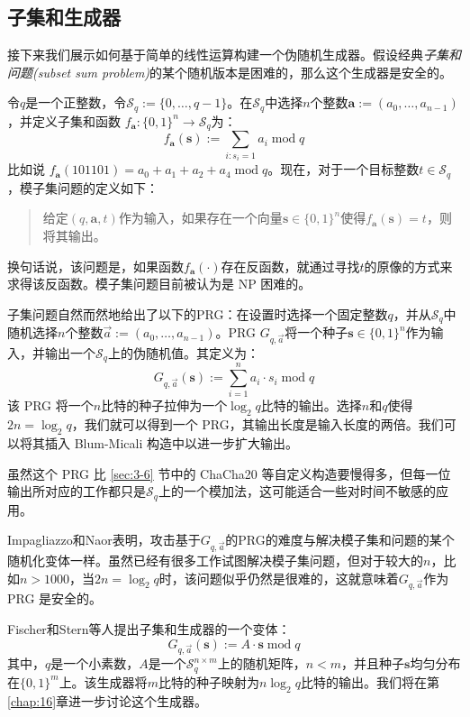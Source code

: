 \subsection{子集和生成器}

接下来我们展示如何基于简单的线性运算构建一个伪随机生成器。假设经典\emph{子集和问题(subset sum problem)}的某个随机版本是困难的，那么这个生成器是安全的。

\begin{snote}[模子集问题。]
令$q$是一个正整数，令$\mathcal{S}_q:=\{0,\dots,q-1\}$。在$\mathcal{S}_q$中选择$n$个整数$\boldsymbol{a}:=(a_0,\dots,a_{n-1})$，并定义子集和函数 $f_{\boldsymbol{a}}:\{0,1\}^n\to\mathcal{S}_q$为：
\[
f_{\boldsymbol{a}}(\boldsymbol{s}):=\sum_{i:s_i=1}a_i\;\mathrm{mod}\;q
\]
比如说 $f_{\boldsymbol{a}}(101101)=a_0+a_1+a_2+a_4\;\mathrm{mod}\;q$。现在，对于一个目标整数$t\in\mathcal{S}_q$，模子集问题的定义如下：
\begin{quote}
给定$(q,\boldsymbol{a},t)$作为输入，如果存在一个向量$\boldsymbol{s}\in\{0,1\}^n$使得$f_{\boldsymbol{a}}(\boldsymbol{s})=t$，则将其输出。
\end{quote}
换句话说，该问题是，如果函数$f_{\boldsymbol{a}}(\cdot)$存在反函数，就通过寻找$t$的原像的方式来求得该反函数。模子集问题目前被认为是 NP 困难的。
\end{snote}

\begin{snote}[子集和与PRG。]
子集问题自然而然地给出了以下的PRG：在设置时选择一个固定整数$q$，并从$\mathcal{S}_q$中随机选择$n$个整数$\vec{a}:=(a_0,\dots,a_{n-1})$。PRG $G_{q,\vec{a}}$将一个种子$\boldsymbol{s}\in\{0,1\}^n$作为输入，并输出一个$\mathcal{S}_q$上的伪随机值。其定义为：
\[
G_{q,\vec{a}}(\boldsymbol{s}):=\sum_{i=1}^na_i\cdot s_i\;\mathrm{mod}\;q
\]
该 PRG 将一个$n$比特的种子拉伸为一个$\log_2q$比特的输出。选择$n$和$q$使得$2n=\log_2q$，我们就可以得到一个 PRG，其输出长度是输入长度的两倍。我们可以将其插入 Blum-Micali 构造中以进一步扩大输出。

虽然这个 PRG 比 \ref{sec:3-6} 节中的 ChaCha20 等自定义构造要慢得多，但每一位输出所对应的工作都只是$\mathcal{S}_q$上的一个模加法，这可能适合一些对时间不敏感的应用。

Impagliazzo和Naor表明，攻击基于$G_{q,\vec{a}}$的PRG的难度与解决模子集和问题的某个随机化变体一样。虽然已经有很多工作试图解决模子集问题，但对于较大的$n$，比如$n>1000$，当$2n=\log_2q$时，该问题似乎仍然是很难的，这就意味着$G_{q,\vec{a}}$作为 PRG 是安全的。
\end{snote}

\begin{snote}[变体。]
Fischer和Stern等人提出子集和生成器的一个变体：
\[
G_{q,\vec{a}}(\boldsymbol{s}):=A\cdot\boldsymbol{s}\;\mathrm{mod}\;q
\]
其中，$q$是一个小素数，$A$是一个$\mathcal{S}_q^{n\times m}$上的随机矩阵，$n<m$，并且种子$\boldsymbol{s}$均匀分布在$\{0,1\}^m$上。该生成器将$m$比特的种子映射为$n\log_2q$比特的输出。我们将在第\ref{chap:16}章进一步讨论这个生成器。
\end{snote}